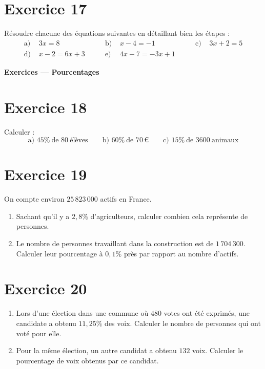 \documentclass[a4paper,11pt]{article}
\begin{document}
\section*{Exercice 17}
Résoudre chacune des équations suivantes en détaillant bien les étapes :
\[
\begin{aligned}
\text{a) }& 3x=8 
&\qquad \text{b) }& x-4=-1
&\qquad \text{c) }& 3x+2=5\\[6pt]
\text{d) }& x-2=6x+3 
&\qquad \text{e) }& 4x-7=-3x+1
\end{aligned}
\]

\bigskip
{\Large \textbf{Exercices — Pourcentages}}\par\medskip

\section*{Exercice 18}
Calculer :
\[
\text{a) }45\%\ \text{de } 80\ \text{élèves}
\qquad
\text{b) }60\%\ \text{de }70\,€
\qquad
\text{c) }15\%\ \text{de }3600\ \text{animaux}
\]

\section*{Exercice 19}
On compte environ \(25\,823\,000\) actifs en France.
\begin{enumerate}
  \item Sachant qu’il y a \(2,8\%\) d’agriculteurs, calculer combien cela représente de personnes.
  \item Le nombre de personnes travaillant dans la construction est de \(1\,704\,300\).  
  Calculer leur pourcentage à \(0,1\%\) près par rapport au nombre d’actifs.
\end{enumerate}

\section*{Exercice 20}
\begin{enumerate}
  \item Lors d’une élection dans une commune où \(480\) votes ont été exprimés, une candidate a obtenu \(11,25\%\) des voix. Calculer le nombre de personnes qui ont voté pour elle.
  \item Pour la même élection, un autre candidat a obtenu \(132\) voix. Calculer le pourcentage de voix obtenus par ce candidat.
\end{enumerate}
\end{document}
